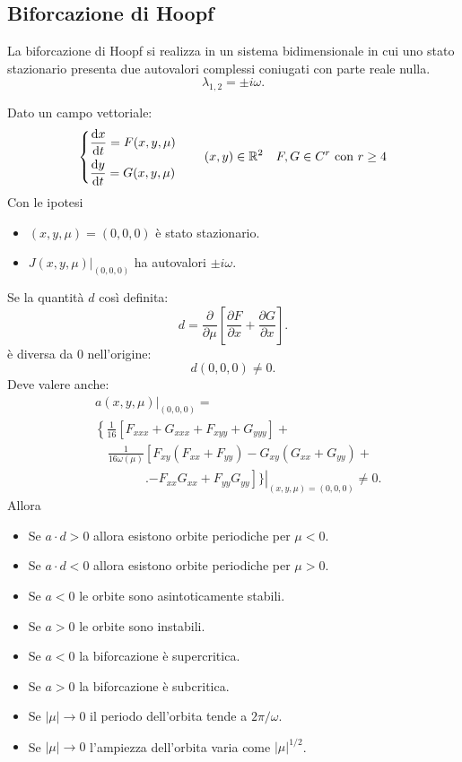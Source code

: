 \subsection{Biforcazione di Hoopf}%
La biforcazione di Hoopf si realizza in un sistema bidimensionale in cui uno stato stazionario presenta due autovalori complessi coniugati con parte reale nulla.
\[
    \lambda_{1, 2} = \pm i \omega
.\] 
\begin{thm}
    Dato un campo vettoriale:
    \[
    \begin{dcases}
	\frac{\text{d} x}{\text{d} t} = F(x, y, \mu) \\
	\frac{\text{d} y}{\text{d} t} = G(x, y, \mu) 
    \end{dcases}
    \qquad  (x, y) \in \mathbb{R}^2 \quad  F, G \in C^r \text{ con } r\ge 4
    \]
    Con le ipotesi
    \begin{itemize}
	\item $(x, y, \mu) = (0, 0, 0) $  è stato stazionario.
	\item $\left.J(x, y, \mu) \right|_{(0, 0, 0)}$  ha autovalori $\pm i\omega$.
    \end{itemize}
    Se la quantità $d$  così definita:
    \[
        d = \frac{\partial }{\partial \mu} \left[\frac{\partial F}{\partial x} + \frac{\partial G}{\partial x} \right]
    .\] 
    è diversa da $0$  nell'origine:
    \[
	d(0, 0, 0) \neq 0
    .\] 
    Deve valere anche:
    \[\begin{aligned}
	&\left.a(x, y, \mu)\right|_{(0, 0, 0) } = \\
	&\left\{\frac{1}{16}\left[F_{xx x} + G_{x x x } + F_{x y y } + G_{y  y y }\right] \right.+ \\
	&\quad\frac{1}{16\omega (\mu)}\left[F_{xy}\left(F_{xx} + F_{yy}\right)\right. - G_{xy}\left(G_{x x} + G_{yy}\right) + \\
	& \qquad \qquad\left.\bigg.\left. - F_{x x }G_{x x }+ F_{yy}G_{yy}\right]\bigg\}\right|_{(x, y, \mu) = (0, 0, 0)}\neq 0
    .\end{aligned}\]
    Allora 
    \begin{itemize}
        \item Se $a\cdot d > 0$ allora esistono orbite periodiche per $\mu <0$.
	\item Se $a\cdot d < 0$ allora esistono orbite periodiche per $\mu > 0$.
	\item Se $a<0$ le orbite sono asintoticamente stabili.
	\item Se $a>0$ le orbite sono instabili.
	\item Se $a<0$ la biforcazione è supercritica.
	\item Se $a>0$ la biforcazione è subcritica.
	\item Se $\left|\mu\right|\to 0$ il periodo dell'orbita tende a $2\pi /\omega$. 
	\item Se $\left|\mu\right|\to 0$ l'ampiezza dell'orbita varia come $\left|\mu\right|^{1 / 2}$.
    \end{itemize}
\end{thm}
